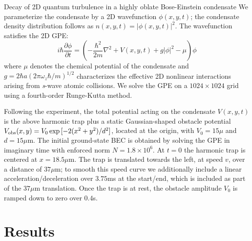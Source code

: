 \begin{chapter}{\label{cha:shin}Decay of 2D quantum turbulence in a highly oblate Bose-Einstein condensate}
We parameterize the condensate by a 2D wavefunction $\phi(x,y,t)$; the condensate density distribution follows as $n(x,y,t)=|\phi(x,y,t)|^2$.  The wavefunction satisfies the 2D GPE:
\begin{equation}
  i\hbar \frac{\partial \phi}{\partial t} = \left(- \frac{\hbar^2}{2m} \nabla ^2  + V(x,y,t) + g |\phi|^2 - \mu \right) \phi
\label{eq:GPE}
\end{equation}
where $\mu$ denotes the chemical potential of the condensate and $g=2 \hbar a (2 \pi \omega_z \hbar/m)^{1/2}$ characterizes the effective 2D nonlinear interactions arising from {\it s}-wave atomic collisions. We solve the GPE on a $1024 \times 1024$ grid using a fourth-order Runge-Kutta method.   

Following the experiment, the total potential acting on the condensate $V(x,y,t)$ is the above harmonic trap plus a static Gaussian-shaped obstacle potential $V_{\rm{obs}}(x,y) = V_0 \exp{[-{2(x^2 + y^2)}/{d^2}]}$, located at the origin, with $V_0=15 \mu$ and $d=15\mu$m.  The initial ground-state BEC is obtained by solving the GPE in imaginary time with enforced norm $N=1.8\times 10^6$.  At $t=0$ the harmonic trap is centered at $x=18.5\mu$m. The trap is translated towards the left, at speed $v$, over a distance of $37 \mu$m; to smooth this speed curve we additionally include a linear acceleration/deceleration over $3.75$ms at the start/end, which is included as part of the $37\mu$m translation.  Once the trap is at rest, the obstacle amplitude $V_0$ is ramped down to zero over $0.4$s.

\section{Results}

\end{chapter}
